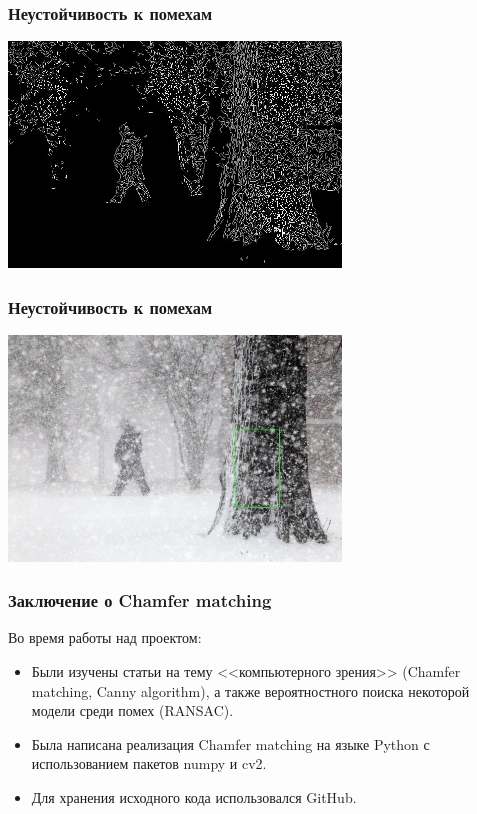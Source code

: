 \begin{frame}\frametitle{Неустойчивость к помехам}
    \begin{center}
        \includegraphics[height=6cm]{veselov_imgs/l_edge_map2.jpg}
    \end{center}
\end{frame}

\begin{frame}\frametitle{Неустойчивость к помехам}
    \begin{center}
        \includegraphics[height=6cm]{veselov_imgs/occurrence2.jpg}
    \end{center}
\end{frame}

\begin{frame}\frametitle{Заключение о Chamfer matching}
    Во время работы над проектом:
    \begin{itemize}
        \item Были изучены статьи на тему
        <<компьютерного зрения>> (Chamfer matching, Canny algorithm), а также
        вероятностного поиска некоторой модели среди помех (RANSAC).
        
        \item Была написана реализация Chamfer matching на языке Python с
        использованием пакетов numpy и cv2.
        
        \item Для хранения исходного кода использовался GitHub.
    \end{itemize}
\end{frame}
